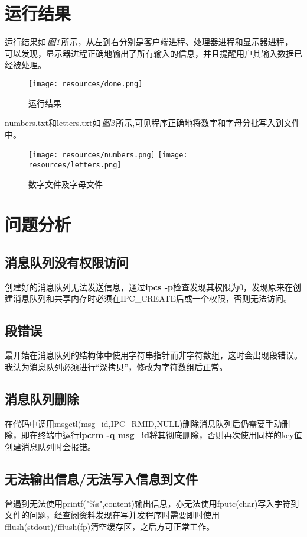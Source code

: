 \documentclass[UTF8]{ctexart}
\newcommand{\reffig}[1]{\,\emph{图\ref{#1}}\,}
\begin{document}
\section{运行结果}
运行结果如\reffig{fig_1}所示，从左到右分别是客户端进程、处理器进程和显示器进程，
可以发现，显示器进程正确地输出了所有输入的信息，并且提醒用户其输入数据已经被处理。\par 
\begin{figure}[htb]
    \centering
    \texttt{[image: resources/done.png]}
    \caption{运行结果}
    \label{fig_1}
\end{figure}

numbers.txt和letters.txt如\reffig{fig_2}所示,可见程序正确地将数字和字母分批写入到文件中。
\begin{figure}[htb]
    \centering
    \texttt{[image: resources/numbers.png]}
    \texttt{[image: resources/letters.png]}
    \caption{数字文件及字母文件}
    \label{fig_2}
\end{figure}

\clearpage
\section{问题分析}
\subsection{消息队列没有权限访问}
创建好的消息队列无法发送信息，通过\textbf{ipcs -p}检查发现其权限为0，发现原来在创建消息队列和共享内存时必须在IPC\_CREATE后或一个权限，否则无法访问。
\subsection{段错误}
最开始在消息队列的结构体中使用字符串指针而非字符数组，这时会出现段错误。我认为消息队列必须进行“深拷贝”，修改为字符数组后正常。
\subsection{消息队列删除}
在代码中调用msgctl(msg\_id,IPC\_RMID,NULL)删除消息队列后仍需要手动删除，即在终端中运行\textbf{ipcrm -q msg\_id}将其彻底删除，否则再次使用同样的key值创建消息队列时会报错。
\subsection{无法输出信息/无法写入信息到文件}
曾遇到无法使用printf("\%s",content)输出信息，亦无法使用fputc(char)写入字符到文件的问题，经查阅资料发现在写并发程序时需要即时使用fflush(stdout)/fflush(fp)清空缓存区，之后方可正常工作。
\end{document}
